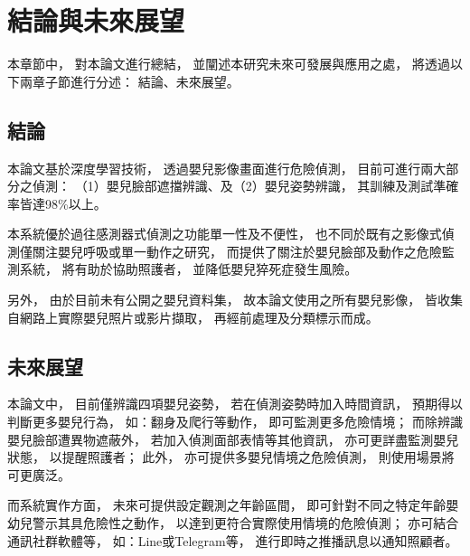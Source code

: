 \documentclass[class=NCU_thesis, crop=false]{standalone}
\begin{document}
\chapter{結論與未來展望}
本章節中，
對本論文進行總結，
並闡述本研究未來可發展與應用之處，
將透過以下兩章子節進行分述：
結論、未來展望。

\section{結論}
本論文基於深度學習技術，
透過嬰兒影像畫面進行危險偵測，
目前可進行兩大部分之偵測：
（1）嬰兒臉部遮擋辨識、及（2）嬰兒姿勢辨識，
其訓練及測試準確率皆達98\%以上。

本系統優於過往感測器式偵測之功能單一性及不便性，
也不同於既有之影像式偵測僅關注嬰兒呼吸或單一動作之研究，
而提供了關注於嬰兒臉部及動作之危險監測系統，
將有助於協助照護者，
並降低嬰兒猝死症發生風險。

另外，
由於目前未有公開之嬰兒資料集，
故本論文使用之所有嬰兒影像，
皆收集自網路上實際嬰兒照片或影片擷取，
再經前處理及分類標示而成。

\newpage

\section{未來展望}
本論文中，
目前僅辨識四項嬰兒姿勢，
若在偵測姿勢時加入時間資訊，
預期得以判斷更多嬰兒行為，
如：翻身及爬行等動作，
即可監測更多危險情境；
而除辨識嬰兒臉部遭異物遮蔽外，
若加入偵測面部表情等其他資訊，
亦可更詳盡監測嬰兒狀態，
以提醒照護者；
此外，
亦可提供多嬰兒情境之危險偵測，
則使用場景將可更廣泛。

而系統實作方面，
未來可提供設定觀測之年齡區間，
即可針對不同之特定年齡嬰幼兒警示其具危險性之動作，
以達到更符合實際使用情境的危險偵測；
亦可結合通訊社群軟體等，
如：Line或Telegram等，
進行即時之推播訊息以通知照顧者。
\end{document}
